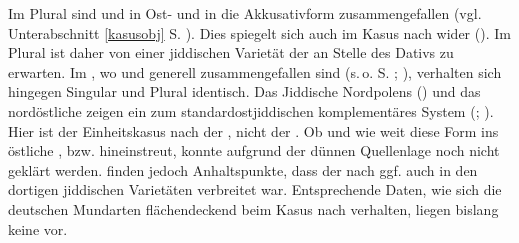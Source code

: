  
 
 Im Plural sind  und  in Ost- und  in die Akkusativform zusammengefallen (vgl. Unterabschnitt \ref{kasusobj} S. \pageref{kasusobj}). Dies spiegelt sich auch im Kasus nach  wider (\cite{FleischerSchaefer2012}). Im Plural ist daher von einer jiddischen Varietät der  an Stelle des Dativs zu erwarten. Im , wo  und  generell zusammengefallen sind (s.\,o. S. \pageref{FNKASUSDIALEKT}; \cite[160]{Zaretski1929}), verhalten sich hingegen Singular und Plural identisch. Das Jiddische Nordpolens (\cite{Herzog1965}) und das nordöstliche  zeigen ein zum standardostjiddischen komplementäres System (\cite{FleischerSchaefer2012}; \cite[130–132]{Herzog1965}). Hier  ist der Einheitskasus nach  der , nicht der . Ob und wie weit diese Form ins östliche ,  bzw.  hineinstreut, konnte aufgrund der dünnen Quellenlage noch nicht geklärt werden. \textcite{FleischerSchaefer2012} finden jedoch Anhaltspunkte, dass der  nach  ggf. auch in den dortigen jiddischen Varietäten verbreitet war. Entsprechende Daten, wie sich die deutschen Mundarten flächendeckend beim Kasus nach  verhalten, liegen bislang keine vor. 
 
